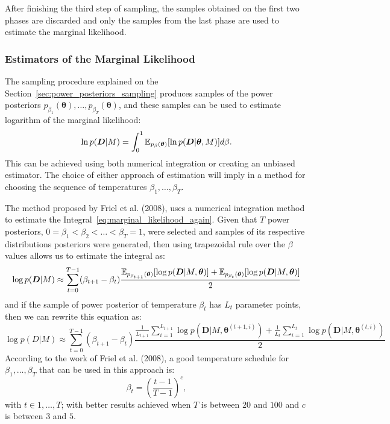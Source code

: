 After finishing the third step of sampling, the samples obtained on the
first two phases are discarded and only the samples from the last phase
are used to estimate the marginal likelihood.

\subsubsection{Estimators of the Marginal Likelihood}
The sampling procedure explained on the 
Section~\ref{sec:power_posteriors_sampling} produces samples of the 
power posteriors $p_{\beta_1} ({\bm \theta}), \ldots, p_{\beta_T} ({\bm
\theta})$, and these samples can be used to estimate logarithm of the 
marginal likelihood:
\begin{equation}
    \ln p ({\bm D} | M) = \int_0^1 \mathbb{E}_{p_\beta ({\bm \theta})} 
        [\ln p({\bm D}|{\bm \theta}, M)]d\beta.
    \label{eq:marginal_likelihood_again}
\end{equation}
This can be achieved using both numerical integration or creating an
unbiased estimator. The choice of either approach of estimation will
imply in a method for choosing the sequence of temperatures $\beta_1, 
\ldots, \beta_T$. 

The method proposed by Friel et al. (2008), uses a numerical integration 
method to estimate the Integral~\ref{eq:marginal_likelihood_again}. 
Given that $T$ power posteriors, $0 = \beta_1 < \beta_2 < \ldots <
\beta_T = 1$, were selected and samples of its respective distributions
posteriors were generated, then using trapezoidal rule over the $\beta$
values allows us to estimate the integral as:
\begin{equation*}
    \log{p({\bm D}| M)} \approx \sum_{t = 0}^{T - 1} (\beta_{t + 1} -
    \beta_t)
\frac{
    \mathbb{E}_{p_{\beta_{t + 1}} ({\bm \theta})}[\log p({\bm D} | M,
    {\bm \theta})]
+ 
    \mathbb{E}_{p_{\beta_{t}} ({\bm \theta})}[\log p({\bm D} | M,
    {\bm \theta})]}
{2}
\end{equation*}
and if the sample of power posterior of temperature $\beta_t$ has $L_t$
parameter points, then we can rewrite this equation as:
\begin{equation}
\log{p(D| M)} \approx \sum_{t = 0}^{T - 1} (\beta_{t + 1} - \beta_t)
\frac{
    \frac{1}{L_{t + 1}}
    \sum_{i = 1}^{L_{t + 1}}  \log p({\bm D} | M, {\bm \theta}^{(t + 1,
    i)})
+ 
    \frac{1}{L_t}
    \sum_{i = 1}^{L_t}  \log p({\bm D} | M, {\bm \theta}^{(t, i)})}
{2}
    \label{eq:marginal_likelihood_trapezoidal_approximation}
\end{equation}
According to the work of Friel et al. (2008), a good temperature 
schedule for $\beta_1, \ldots, \beta_T$ that can be used in this 
approach is:
\begin{equation*}
    \beta_t = \left(\frac{t - 1}{T - 1}\right)^{c}, 
\end{equation*}
with $t \in {1, \ldots, T}$; with better results achieved when $T$ is
between $20$ and $100$ and $c$ is between $3$ and $5$.

